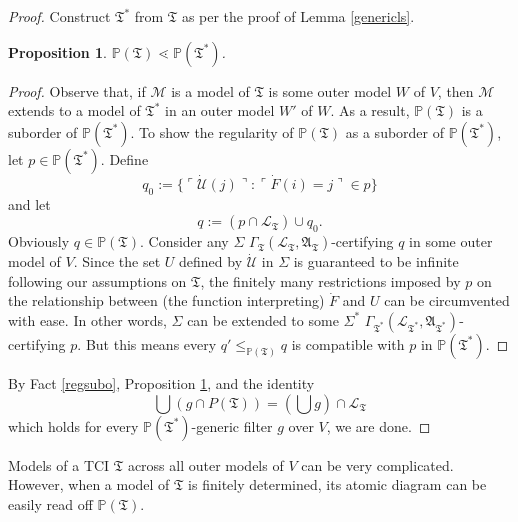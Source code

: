 \documentclass[12pt, twoside]{memoir}
\numberwithin{equation}{section}
\newtheorem{prop}[thm]{Proposition}
\theoremstyle{definition}
\theoremstyle{remark}
\theoremstyle{definition}
\theoremstyle{definition}
\theoremstyle{definition}
\theoremstyle{remark}
\begin{document}
\begin{proof}
Construct $\mathfrak{T}^*$ from $\mathfrak{T}$ as per the proof of Lemma \ref{genericls}.

\begin{prop}\label{ptsspts}
$\mathbb{P}(\mathfrak{T}) \lessdot \mathbb{P}(\mathfrak{T}^*)$.
\end{prop}

\begin{proof}
Observe that, if $\mathcal{M}$ is a model of $\mathfrak{T}$ is some outer model $W$ of $V$, then $\mathcal{M}$ extends to a model of $\mathfrak{T}^*$ in an outer model $W'$ of $W$. As a result, $\mathbb{P}(\mathfrak{T})$ is a suborder of $\mathbb{P}(\mathfrak{T}^*)$. To show the regularity of $\mathbb{P}(\mathfrak{T})$ as a suborder of $\mathbb{P}(\mathfrak{T}^*)$, let $p \in \mathbb{P}(\mathfrak{T}^*)$. Define $$q_0 := \{\ulcorner \dot{\mathcal{U}}(j) \urcorner : \ulcorner \dot{F}(i) = j \urcorner \in p\}$$ and let $$q := (p \cap \mathcal{L}_{\mathfrak{T}}) \cup q_0.$$ Obviously $q \in \mathbb{P}(\mathfrak{T})$. Consider any $\Sigma$ $\Gamma_{\mathfrak{T}} (\mathcal{L}_{\mathfrak{T}}, \mathfrak{A}_{\mathfrak{T}})$-certifying $q$ in some outer model of $V$. Since the set $U$ defined by $\dot{\mathcal{U}}$ in $\Sigma$ is guaranteed to be infinite following our assumptions on $\mathfrak{T}$, the finitely many restrictions imposed by $p$ on the relationship between (the function interpreting) $\dot{F}$ and $U$ can be circumvented with ease. In other words, $\Sigma$ can be extended to some $\Sigma^*$ $\Gamma_{\mathfrak{T}^*} (\mathcal{L}_{\mathfrak{T}^*}, \mathfrak{A}_{\mathfrak{T}^*})$-certifying $p$. But this means every $q' \leq_{\mathbb{P}(\mathfrak{T})} q$ is compatible with $p$ in $\mathbb{P}(\mathfrak{T}^*)$.
\end{proof}

By Fact \ref{regsubo}, Proposition \ref{ptsspts}, and the identity
\begin{equation*}
    \bigcup (g \cap P(\mathfrak{T})) = (\bigcup g) \cap \mathcal{L}_{\mathfrak{T}}
\end{equation*}
which holds for every $\mathbb{P}(\mathfrak{T}^*)$-generic filter $g$ over $V$, we are done.
\end{proof}

Models of a TCI $\mathfrak{T}$ across all outer models of $V$ can be very complicated. However, when a model of $\mathfrak{T}$ is finitely determined, its atomic diagram can be easily read off $\mathbb{P}(\mathfrak{T})$.
\end{document}
